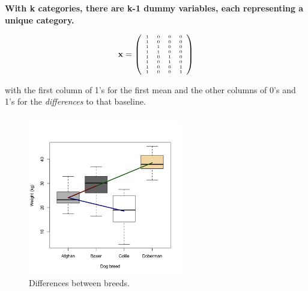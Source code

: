 \documentclass{beamer}
\begin{document}
\begin{frame}
  \frametitle{}
  \textbf{With k categories, there are k-1 dummy variables, each representing a unique category.}
  \vspace{0.5cm}
  
  \begin{equation*}
  \tiny {\mathbf{x} = \left( \begin{array}{cccc} 1 & 0 & 0 & 0 \\ 1 & 0 & 0 & 0 \\ 1 & 1 & 0 & 0 \\ 1 & 1 & 0 & 0 \\ 1 & 0 & 1 & 0 \\ 1 & 0 & 1 & 0 \\ 1 & 0 & 0 & 1\\ 1 & 0 & 0 & 1 \end{array}\right) }
  \end{equation*}
  \vspace{0.5cm}

  with the first column of 1's for the first mean and the other columns of 0's and 1's for the \textit{differences} to that baseline.
\end{frame}

\begin{frame}
  \frametitle{}
  \begin{figure}[h]
    \centering
    \includegraphics[width=0.6\textwidth]{lectures/day_3_LM_refresh_II/figures/unnamed-chunk-13-1.png} 
    \caption{Differences between breeds.}
  \end{figure}
\end{frame}
\end{document}
